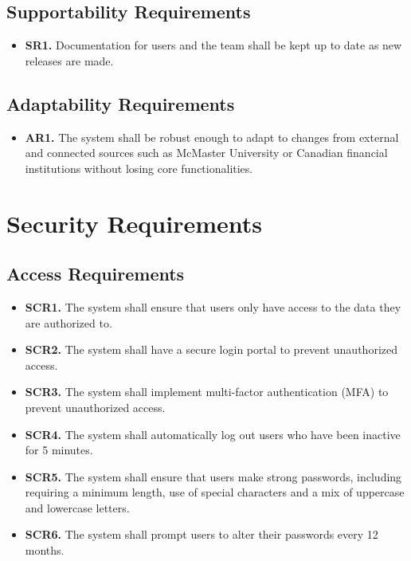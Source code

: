 \documentclass[12pt]{article}
\begin{document}
\subsection{Supportability Requirements}

\label{SR}

\begin{itemize}
    \item \textbf{SR1.} Documentation for users and the team shall be kept up to date as new releases are made.
\end{itemize}

\subsection{Adaptability Requirements}

\label{AR}

\begin{itemize}
    \item \textbf{AR1.} The system shall be robust enough to adapt to changes from external and connected sources such as McMaster University or Canadian financial institutions without losing core functionalities.
\end{itemize}

\section{Security Requirements}
\subsection{Access Requirements}

\label{SCR}

\begin{itemize}
    \item \textbf{SCR1.} The system shall ensure that users only have access to the data they are authorized to.
    \item \textbf{SCR2.} The system shall have a secure login portal to prevent unauthorized access.
    \item \textbf{SCR3.} The system shall implement multi-factor authentication (MFA) to prevent unauthorized access.
    \item \textbf{SCR4.} The system shall automatically log out users who have been inactive for 5 minutes.
    \item \textbf{SCR5.} The system shall ensure that users make strong passwords, including requiring a minimum length, use of special characters and a mix of uppercase and lowercase letters.
    \item \textbf{SCR6.} The system shall prompt users to alter their passwords every 12 months.
\end{itemize}
\end{document}
